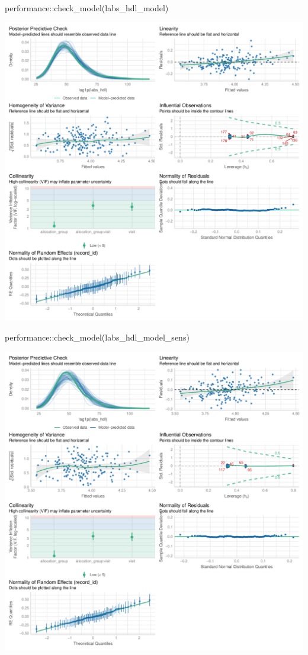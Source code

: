 \documentclass[
  letterpaper,
  DIV=11,
  numbers=noendperiod]{scrartcl}
\newenvironment{Shaded}{\begin{snugshade}}{\end{snugshade}}
\newcommand{\FunctionTok}[1]{\textcolor[rgb]{0.28,0.35,0.67}{#1}}
\newcommand{\NormalTok}[1]{\textcolor[rgb]{0.00,0.23,0.31}{#1}}
\newcommand{\SpecialCharTok}[1]{\textcolor[rgb]{0.37,0.37,0.37}{#1}}
\begin{document}
\begin{Shaded}
\begin{Highlighting}[]
\NormalTok{performance}\SpecialCharTok{::}\FunctionTok{check\_model}\NormalTok{(labs\_hdl\_model)}
\end{Highlighting}
\end{Shaded}

\includegraphics{Outcomes_V1V2V3_files/figure-pdf/labs_hdl_4-1.pdf}

\begin{Shaded}
\begin{Highlighting}[]
\NormalTok{performance}\SpecialCharTok{::}\FunctionTok{check\_model}\NormalTok{(labs\_hdl\_model\_sens)}
\end{Highlighting}
\end{Shaded}

\includegraphics{Outcomes_V1V2V3_files/figure-pdf/labs_hdl_4-2.pdf}
\end{document}
